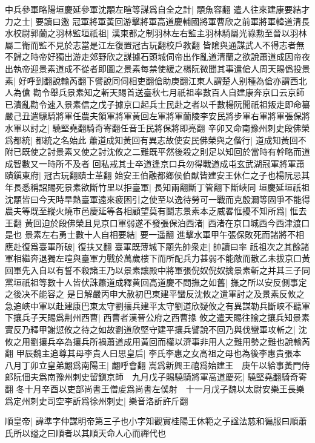 中兵參軍略陽垣慶延參軍沈顒左暄等謀爲自全之計|{
	顒魚容翻}
遣人往來建康要結才力之士|{
	要讀曰邀}
冠軍將軍黃回游擊將軍高道慶輔國將軍曹欣之前軍將軍韓道清長水校尉郭蘭之羽林監垣祇祖|{
	漢東都之制羽林左右監主羽林騎屬光祿勲至晉以羽林屬二衛而監不見於志當是江左復置冠古玩翻校戶教翻}
皆隂與通謀武人不得志者無不歸之時帝好獨出游走郊野欣之謀據石頭城伺帝出作亂道清蘭之欲說蕭道成因帝夜出執帝迎景素道成不從者即圖之景素每禁使緩之楊阮微聞其事遣傖人周天賜僞投景素|{
	好呼到翻說輸芮翻下譬說同伺相吏翻傖助庚翻江東人謂楚人别種為傖亦謂西北人為傖}
勸令舉兵景素知之斬天賜首送臺秋七月祇祖率數百人自建康奔京口云京師已潰亂勸令速入景素信之戊子據京口起兵士民赴之者以千數楊阮聞祇祖叛走即命纂嚴己丑遣驃騎將軍任農夫領軍將軍黃回左軍將軍蘭陵李安民將步軍右軍將軍張保將水軍以討之|{
	驍堅堯翻騎奇寄翻任音壬民將保將即亮翻}
辛卯又命南豫州刺史段佛榮爲都統|{
	都統之名始此}
蕭道成知黃回有異志故使安民佛榮與之偕行|{
	道成知黃回不附已既使之討景素又使之討沈攸之二難既平然後殺之則足以知回於當時有幹略而道成智數又一時所不及者}
回私戒其士卒道逢京口兵勿得戰道成屯玄武湖冠軍將軍蕭賾鎭東府|{
	冠古玩翻賾士革翻}
始安王伯融都鄉侯伯猷皆建安王休仁之子也楊阮忌其年長悉稱詔賜死景素欲斷竹里以拒臺軍|{
	長知兩翻斷丁管翻下斷峽同}
垣慶延垣祇祖沈顒皆曰今天時旱熱臺軍遠來疲困引之使至以逸待勞可一戰而克殷濔等固爭不能得農夫等既至縱火燒市邑慶延等各相顧望莫有鬬志景素本乏威畧恇擾不知所爲|{
	恇去王翻}
黃回迫於段佛榮且見京口軍弱遂不發張保泊西渚|{
	西渚在京口城西今西津渡口是也}
景素左右勇士數十人自相要結|{
	要一遥翻}
進擊水軍甲午張保敗死而諸將不相應赴復爲臺軍所破|{
	復扶又翻}
臺軍既薄城下顒先帥衆走|{
	帥讀曰率}
祇祖次之其餘諸軍相繼奔退獨左暄與臺軍力戰於萬歲樓下而所配兵力甚弱不能敵而散乙未拔京口黃回軍先入自以有誓不殺諸王乃以景素讓殿中將軍張倪奴倪奴擒景素斬之并其三子同黨垣祇祖等數十人皆伏誅蕭道成釋黄回高道慶不問撫之如舊|{
	撫之所以安反側事定之後决不能容之}
是日解嚴丙申大赦初巴東建平蠻反沈攸之遣軍討之及景素反攸之急追峽中軍以赴建康巴東太守劉攘兵建平太守劉道欣疑攸之有異謀勒兵斷峽不聽軍下攘兵子天賜爲荆州西曹|{
	西曹者漢晉公府之西曹掾}
攸之遣天賜往諭之攘兵知景素實反乃釋甲謝愆攸之待之如故劉道欣堅守建平攘兵譬說不回乃與伐蠻軍攻斬之|{
	沈攸之用劉攘兵卒為攘兵所禍蕭道成用黃回而權以濟事非用人之難用勢之難也說輸芮翻}
甲辰魏主追尊其母李貴人曰思皇后|{
	李氏李惠之女高祖之母也為後李惠貴張本}
八月丁卯立皇弟翽爲南陽王|{
	翽呼會翻}
嵩爲新興王禧爲始建王　庚午以給事黃門侍郎阮佃夫爲南豫州刺史留鎭京師　九月戊子賜驍騎將軍高道慶死|{
	驍堅堯翻騎奇寄翻}
冬十月辛酉以吏部尚書王僧䖍爲尚書左僕射　十一月戊子魏以太尉安樂王長樂爲定州刺史司空李訢爲徐州刺史|{
	樂音洛訢許斤翻}


順皇帝|{
	諱準字仲謀明帝第三子也小字知觀實桂陽王休範之子諡法慈和徧服曰順蕭氏所以謚之曰順者以其順天命人心而禪代也}


